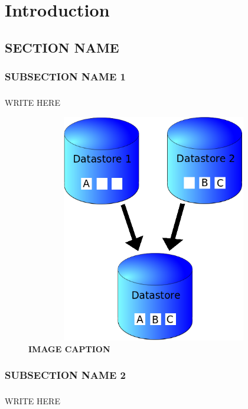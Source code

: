 \chapter{Introduction}
\section{SECTION NAME}
\subsection{SUBSECTION NAME 1}
\paragraph{}WRITE HERE

\begin{figure}[H]
  \centering
    \includegraphics[height= 10cm, width=15cm]{project/images/data-sync}
  \caption{\textbf{IMAGE CAPTION}}
\end{figure}

\subsection{SUBSECTION NAME 2}
\paragraph{}WRITE HERE
